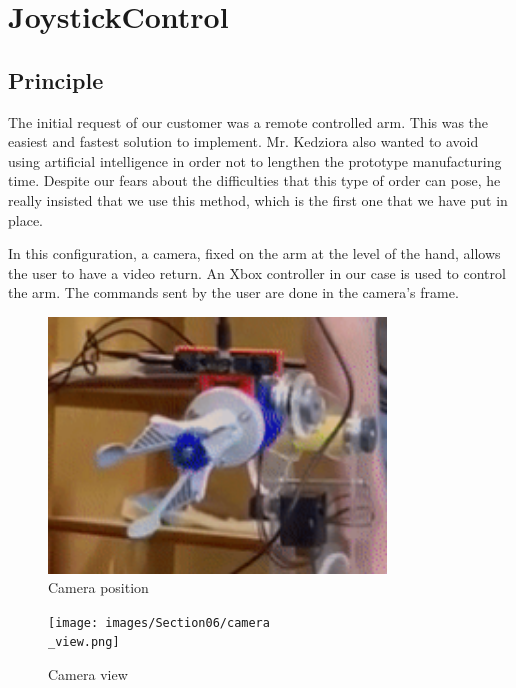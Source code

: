 \section{JoystickControl}\insertloftspace
\setcounter{figure}{0}\setcounter{table}{0}

\subsection{Principle}

\hspace{\parindent} The initial request of our customer was a remote controlled arm. This was the easiest and fastest solution to implement. Mr. Kedziora also wanted to avoid using artificial intelligence in order not to lengthen the prototype manufacturing time. Despite our fears about the difficulties that this type of order can pose, he really insisted that we use this method, which is the first one that we have put in place.

\bigbreak
In this configuration, a camera, fixed on the arm at the level of the hand, allows the user to have a video return. An Xbox controller in our case is used to control the arm. The commands sent by the user are done in the camera's frame.

\begin{figure}[ht]
    \centering
    \includegraphics[width=0.8\textwidth]{images/Section06/camera.png}
    \caption{Camera position}
    \label{fig:mesh16}
\end{figure}
\FloatBarrier

\begin{figure}[ht]
    \centering
    \texttt{[image: images/Section06/camera\\\_view.png]}
    \caption{Camera view}
    \label{fig:mesh17}
\end{figure}
\FloatBarrier

